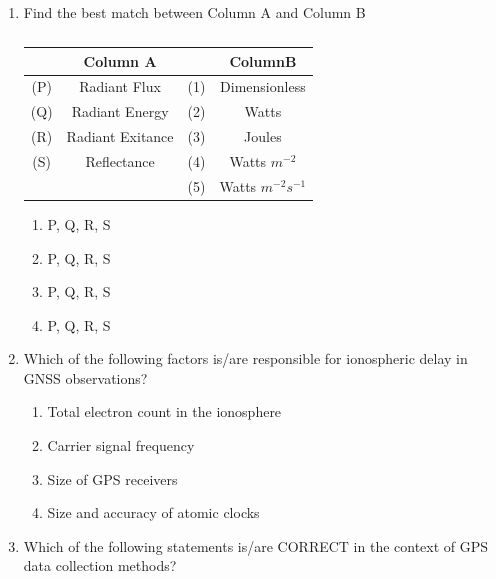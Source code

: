 \documentclass[12pt]{article}
\begin{document}
\begin{enumerate}
\item Find the best match between Column A and Column B

\begin{table}[H]
         \centering
         \caption{}
         \begin{tabular}{|c|c|c|c|}
         \hline
              &Column A&  &ColumnB\\ \hline
              (P)& Radiant Flux& (1) & Dimensionless\\ \hline
              (Q)& Radiant Energy& (2) & Watts\\ \hline
              (R)& Radiant Exitance& (3) & Joules\\ \hline
              (S)& Reflectance& (4) & Watts $m^{-2}$\\ \hline 
               & & (5) & Watts $m^{-2}s^{-1}$\\ \hline
         \end{tabular}
         \label{tab:placeholder}
     \end{table}

\begin{enumerate}
    \item P, Q, R, S 
   \item P, Q, R, S 
   \item P, Q, R, S 
   \item P, Q, R, S

   
\end{enumerate}

\item Which of the following factors is/are responsible for ionospheric delay in GNSS
observations? 

\begin{enumerate}
    \item Total electron count in the ionosphere 
   \item Carrier signal frequency 
   \item Size of GPS receivers 
   \item Size and accuracy of atomic clocks
\end{enumerate}

\item Which of the following statements is/are CORRECT in the context of GPS data
collection methods?


\end{enumerate}
\end{document}
